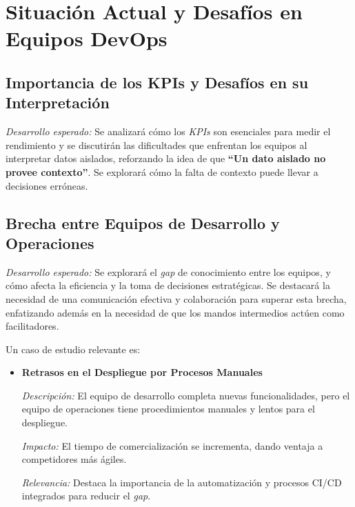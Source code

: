 \documentclass[journal]{IEEEtran}
\begin{document}
\section{\textbf{\Large Situación Actual y Desafíos en Equipos DevOps}}



\subsection{\textbf{Importancia de los KPIs y Desafíos en su Interpretación}}

\textit{Desarrollo esperado:} Se analizará cómo los \textit{KPIs} son esenciales para medir el rendimiento y se discutirán las dificultades que enfrentan los equipos al interpretar datos aislados, reforzando la idea de que \textbf{``Un dato aislado no provee contexto''}. Se explorará cómo la falta de contexto puede llevar a decisiones erróneas.

\subsection{\textbf{Brecha entre Equipos de Desarrollo y Operaciones}}

\textit{Desarrollo esperado:} Se explorará el \textit{gap} de conocimiento entre los equipos, y cómo afecta la eficiencia y la toma de decisiones estratégicas. Se destacará la necesidad de una comunicación efectiva y colaboración para superar esta brecha, enfatizando además en la necesidad de que los mandos intermedios actúen como facilitadores.

Un caso de estudio relevante es:

\begin{itemize}
    \item \textbf{Retrasos en el Despliegue por Procesos Manuales}
    
    \textit{Descripción:} El equipo de desarrollo completa nuevas funcionalidades, pero el equipo de operaciones tiene procedimientos manuales y lentos para el despliegue.
    
    \textit{Impacto:} El tiempo de comercialización se incrementa, dando ventaja a competidores más ágiles.
    
    \textit{Relevancia:} Destaca la importancia de la automatización y procesos CI/CD integrados para reducir el \textit{gap}.
\end{itemize}
\end{document}
